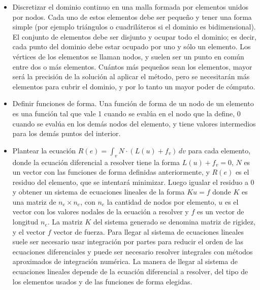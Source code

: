 \begin{itemize}
	\item Discretizar el dominio continuo en una malla formada por elementos unidos por nodos. Cada uno de estos elementos debe ser pequeño y tener una forma simple (por ejemplo triángulos o cuadriláteros si el dominio es bidimensional). El conjunto de elementos debe ser disjunto y ocupar todo el dominio; es decir, cada punto del dominio debe estar ocupado por uno y sólo un elemento. Los vértices de los elementos se llaman nodos, y suelen ser un punto en común entre dos o más elementos. Cuántos más pequeños sean los elementos, mayor será la precisión de la solución al aplicar el método, pero se necesitarán más elementos para cubrir el dominio, y por lo tanto un mayor poder de cómputo. 

	\item Definir funciones de forma. Una función de forma  de un nodo de un elemento es una función tal que vale 1 cuando se evalúa en el nodo que la define, 0 cuando se evalúa en los demás nodos del elemento, y tiene valores intermedios para los demás puntos del interior. 

	\item Plantear la ecuación $R(e) = \int_{v} N \cdot (L(u) + f_v)\, dv$  para cada elemento, donde la ecuación diferencial a resolver tiene la forma $L(u) + f_v = 0$, $N$ es un vector con las funciones de forma definidas anteriormente, y $R(e)$ es el residuo del elemento, que se intentará minimizar. Luego igualar el residuo a 0 y obtener un sistema de ecuaciones lineales de la forma $K u = f$ donde $K$ es una matriz de $n_e \times n_e$, con $n_e$ la cantidad de nodos por elemento, $u$ es el vector con los valores nodales de la ecuación a resolver y $f$ es un vector de longitud $n_e$. La matriz $K$ del sistema generado se denomina matriz de rigidez, y el vector $f$ vector de fuerza. Para llegar al sistema de ecuaciones lineales suele ser necesario usar integración por partes para reducir el orden de las ecuaciones diferenciales y puede ser necesario resolver integrales con métodos aproximados de integración numérica. La manera de llegar al sistema de ecuaciones lineales depende de la ecuación diferencial a resolver, del tipo de los elementos usados y de las funciones de forma elegidas. 
	

\end{itemize}
